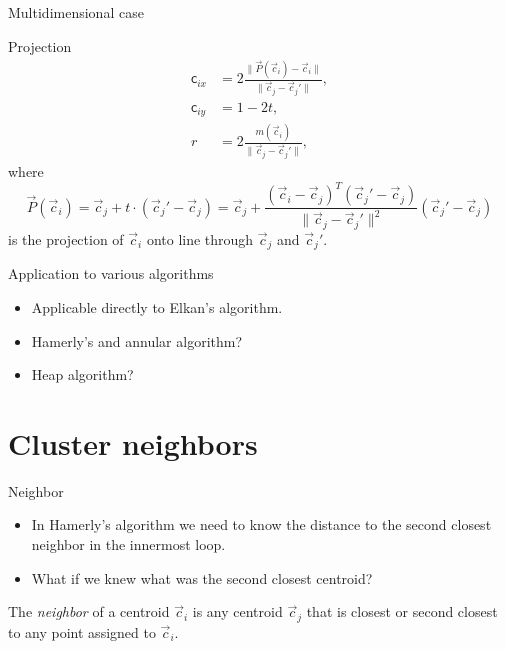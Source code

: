 \documentclass[10pt, compress]{beamer}
\newcommand{\cj}{\vec{c}_j}
\newcommand{\ci}{\vec{c}_i}
\newcommand{\movcj}{\| \cj - \cj' \|}
\newcommand{\mci}{m(\ci)}
\begin{document}
\begin{frame}{Multidimensional case}
  \begin{center}
    
  \end{center}
\end{frame}

\begin{frame}{Projection}
  \begin{align*}
    \mathsf{c}_{ix} &= 2 \frac{\| \vec{P}(\ci) - \ci \| }{ \movcj },
    \\
    \mathsf{c}_{iy} &= 1-2t,
    \\
    r &= 2 \frac{\mci}{\movcj},
  \end{align*}
  where
  \begin{equation*}
    \vec{P}(\ci) = \cj + t \cdot (\cj' - \cj)= \cj + \frac{(\ci-\cj)^T(\cj' - \cj)}{\movcj^2} (\cj' - \cj)
  \end{equation*}
  is the projection of $\ci$ onto line through $\cj$ and $\cj'$.
\end{frame}

\begin{frame}{Application to various algorithms}
  \begin{itemize}
    \item Applicable directly to Elkan's algorithm.
    \item Hamerly's and annular algorithm?
    \item Heap algorithm?
  \end{itemize}
\end{frame}

\section{Cluster neighbors}

\begin{frame}{Neighbor}
  \begin{itemize}
    \item In Hamerly's algorithm we need to know the distance to the second closest neighbor in the innermost loop.
    \item What if we knew what was the second closest centroid?
  \end{itemize}
  \begin{definition}
    The \emph{neighbor} of a centroid $\ci$ is any centroid $\cj$
    that is closest or second closest to any point assigned to $\ci$.
  \end{definition}
\end{frame}
\end{document}
